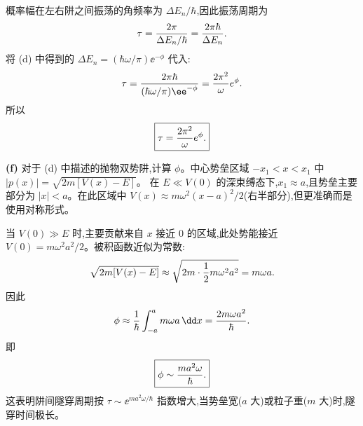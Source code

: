 \begin{solution}
概率幅在左右阱之间振荡的角频率为 $\Delta E_n/\hbar$,因此振荡周期为
\[
\tau={2\pi\over\Delta E_n/\hbar}={2\pi\hbar\over\Delta E_n}.
\]
将 (d) 中得到的 $\Delta E_n=(\hbar\omega/\pi)\ee^{-\phi}$ 代入:
\[
\tau={2\pi\hbar\over(\hbar\omega/\pi)\ee^{-\phi}}
={2\pi^2\over\omega}e^\phi.
\]
所以
\[
\boxed{\tau={2\pi^2\over\omega}e^\phi.}
\]

\textbf{(f)} 对于 (d) 中描述的抛物双势阱,计算 $\phi$。中心势垒区域 $-x_1<x<x_1$ 中 $|p(x)|=\sqrt{2m[V(x)-E]}$。
在 $E\ll V(0)$ 的深束缚态下,$x_1\approx a$,且势垒主要部分为 $|x|<a$。在此区域中 $V(x)\approx m\omega^2(x-a)^2/2$(右半部分),但更准确而是使用对称形式。

当 $V(0)\gg E$ 时,主要贡献来自 $x$ 接近 $0$ 的区域,此处势能接近 $V(0)=m\omega^2a^2/2$。被积函数近似为常数:
\[
\sqrt{2m[V(x)-E]}\approx\sqrt{2m\cdot{1\over2}m\omega^2a^2}=m\omega a.
\]
因此
\[
\phi\approx{1\over\hbar}\int_{-a}^{a}m\omega a\,\dd x
={2m\omega a^2\over\hbar}.
\]
即
\[
\boxed{\phi\sim{ma^2\omega\over\hbar}.}
\]
这表明阱间隧穿周期按 $\tau\sim \ee^{ma^2\omega/\hbar}$ 指数增大,当势垒宽($a$ 大)或粒子重($m$ 大)时,隧穿时间极长。
\end{solution}

